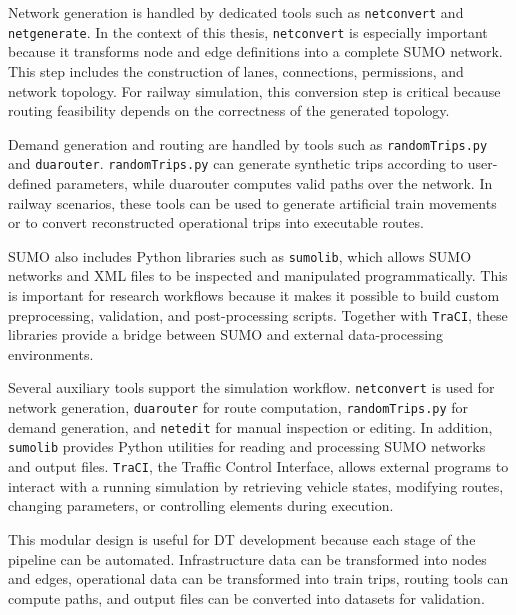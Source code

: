 Network generation is handled by dedicated tools such as \texttt{netconvert} and \texttt{netgenerate}. In the context of 
this thesis, \texttt{netconvert} is especially important because it transforms node and edge definitions into a complete 
SUMO network. This step includes the construction of lanes, connections, permissions, and network topology. For railway 
simulation, this conversion step is critical because routing feasibility depends on the correctness of the generated 
topology.

Demand generation and routing are handled by tools such as \texttt{randomTrips.py} and \texttt{duarouter}. 
\texttt{randomTrips.py} can generate synthetic trips according to user-defined parameters, while duarouter computes valid 
paths over the network. In railway scenarios, these tools can be used to generate artificial train movements or to convert 
reconstructed operational trips into executable routes.

SUMO also includes Python libraries such as \texttt{sumolib}, which allows SUMO networks and XML files to be inspected 
and manipulated programmatically. This is important for research workflows because it makes it possible to build custom 
preprocessing, validation, and post-processing scripts. Together with \texttt{TraCI}, these libraries provide a bridge 
between SUMO and external data-processing environments.

Several auxiliary tools support the simulation workflow. \texttt{netconvert} is used for network generation, 
\texttt{duarouter} for route computation, \texttt{randomTrips.py} for demand generation, and \texttt{netedit} for manual 
inspection or editing. In addition, \texttt{sumolib} provides Python utilities for reading and processing SUMO networks 
and output files. \texttt{TraCI}, the Traffic Control Interface, allows external programs to interact with a running 
simulation by retrieving vehicle states, modifying routes, changing parameters, or controlling elements during execution.

This modular design is useful for DT development because each stage of the pipeline can be automated. Infrastructure data 
can be transformed into nodes and edges, operational data can be transformed into train trips, routing tools can compute 
paths, and output files can be converted into datasets for validation. 



